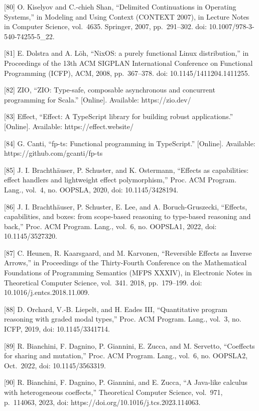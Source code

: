 {[}80{]} O. Kiselyov and C.-chieh Shan, ``Delimited Continuations in Operating
Systems,'' in Modeling and Using Context (CONTEXT 2007), in Lecture Notes in
Computer Science, vol.~4635. Springer, 2007, pp.~291--302. doi:
10.1007/978-3-540-74255-5\_22.

{[}81{]} E. Dolstra and A. Löh, ``NixOS: a purely functional Linux distribution,'' in
Proceedings of the 13th ACM SIGPLAN International Conference on Functional
Programming (ICFP), ACM, 2008, pp.~367--378. doi: 10.1145/1411204.1411255.

{[}82{]} ZIO, ``ZIO: Type-safe, composable asynchronous and concurrent programming
for Scala.'' {[}Online{]}. Available: https://zio.dev/

{[}83{]} Effect, ``Effect: A TypeScript library for building robust applications.''
{[}Online{]}. Available: https://effect.website/

{[}84{]} G. Canti, ``fp-ts: Functional programming in TypeScript.'' {[}Online{]}.
Available: https://github.com/gcanti/fp-ts

{[}85{]} J. I. Brachthäuser, P. Schuster, and K. Ostermann, ``Effects as capabilities:
effect handlers and lightweight effect polymorphism,'' Proc. ACM Program. Lang.,
vol.~4, no. OOPSLA, 2020, doi: 10.1145/3428194.

{[}86{]} J. I. Brachthäuser, P. Schuster, E. Lee, and A. Boruch-Gruszecki, ``Effects,
capabilities, and boxes: from scope-based reasoning to type-based reasoning and
back,'' Proc. ACM Program. Lang., vol.~6, no. OOPSLA1, 2022, doi: 10.1145/3527320.

{[}87{]} C. Heunen, R. Kaarsgaard, and M. Karvonen, ``Reversible Effects as Inverse
Arrows,'' in Proceedings of the Thirty-Fourth Conference on the Mathematical
Foundations of Programming Semantics (MFPS XXXIV), in Electronic Notes in
Theoretical Computer Science, vol.~341. 2018, pp.~179--199. doi:
10.1016/j.entcs.2018.11.009.

{[}88{]} D. Orchard, V.-B. Liepelt, and H. Eades III, ``Quantitative program
reasoning with graded modal types,'' Proc. ACM Program. Lang., vol.~3, no. ICFP,
2019, doi: 10.1145/3341714.

{[}89{]} R. Bianchini, F. Dagnino, P. Giannini, E. Zucca, and M. Servetto, ``Coeffects
for sharing and mutation,'' Proc. ACM Program. Lang., vol.~6, no. OOPSLA2,
Oct.~2022, doi: 10.1145/3563319.

{[}90{]} R. Bianchini, F. Dagnino, P. Giannini, and E. Zucca, ``A Java-like calculus
with heterogeneous coeffects,'' Theoretical Computer Science, vol.~971, p.~114063,
2023, doi: https://doi.org/10.1016/j.tcs.2023.114063.

